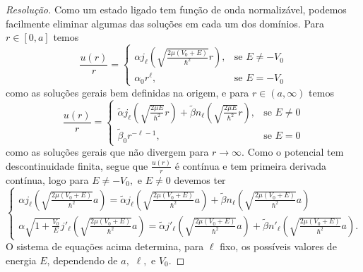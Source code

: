 \begin{proof}[Resolução]
    Como um estado ligado tem função de onda normalizável, podemos facilmente eliminar algumas das soluções em cada um dos domínios. Para \(r \in [0, a]\) temos
    \begin{equation*}
        \frac{u(r)}{r} = \begin{cases}
            \alpha j_{\ell}\left(\sqrt{\frac{2\mu(V_0 + E)}{\hbar^2}} r\right), &\text{se } E \neq -V_0\\
            \alpha_0 r^{\ell}, &\text{se } E = -V_0
        \end{cases}
    \end{equation*}
    como as soluções gerais bem definidas na origem, e para \(r \in (a, \infty)\) temos
    \begin{equation*}
        \frac{u(r)}{r} = \begin{cases}
            \tilde{\alpha}j_{\ell}\left(\sqrt{\frac{2\mu E}{\hbar^2}} r\right) + \tilde{\beta} n_{\ell}\left(\sqrt{\frac{2\mu E}{\hbar^2}}r\right),&\text{se } E\neq 0\\
            \tilde{\beta}_0 r^{-\ell - 1},&\text{se } E = 0
        \end{cases}
    \end{equation*}
    como as soluções gerais que não divergem para \(r \to \infty\). Como o potencial tem descontinuidade finita, segue que \(\frac{u(r)}{r}\) é contínua e tem primeira derivada contínua, logo para \(E \neq -V_0,\) e \(E \neq 0\) devemos ter
    \begin{equation*}
        \begin{cases}
            \alpha j_\ell\left(\sqrt{\frac{2\mu(V_0 + E)}{\hbar^2}} a\right) = \tilde{\alpha} j_\ell\left(\sqrt{\frac{2\mu(V_0 + E)}{\hbar^2}} a\right) + \tilde{\beta} n_\ell\left(\sqrt{\frac{2\mu(V_0 + E)}{\hbar^2}} a\right)\\
            \alpha \sqrt{1 + \frac{V_0}{E}}j'_\ell\left(\sqrt{\frac{2\mu(V_0 + E)}{\hbar^2}} a\right) = \tilde{\alpha} j'_\ell\left(\sqrt{\frac{2\mu(V_0 + E)}{\hbar^2}} a\right) + \tilde{\beta} n'_\ell\left(\sqrt{\frac{2\mu(V_0 + E)}{\hbar^2}} a\right).
        \end{cases}
    \end{equation*}
    O sistema de equações acima determina, para \(\ell\) fixo, os possíveis valores de energia \(E\), dependendo de \(a,\) \(\ell,\) e \(V_0.\)
\end{proof}
